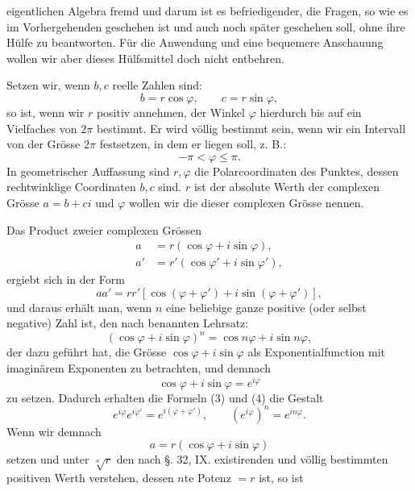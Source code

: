 
eigentlichen Algebra fremd und darum ist es befriedigender, die  Fragen, so wie es im Vorhergehenden geschehen ist und auch noch später geschehen soll, ohne ihre Hülfe zu beantworten. Für die Anwendung und eine bequemere Anschauung wollen wir aber dieses Hülfsmittel doch nicht entbehren.

Setzen wir, wenn $b,c$ reelle Zahlen sind:
\begin{equation}
 b=r\cos\varphi,\qquad c=r\sin\varphi,
\tag{1}
\end{equation}
so ist, wenn wir $r$ positiv annehmen, der Winkel $\varphi$ hierdurch bis auf ein Vielfaches von $2\pi$ bestimmt. Er wird völlig bestimmt sein, wenn wir ein Intervall von der Grösse $2\pi$ festsetzen, in dem er liegen soll, z. B.:
\[
 -\pi<\varphi\le \pi.
\]
In geometrischer Auffassung sind $r,\varphi$ die Polarcoordinaten des Punktes, dessen rechtwinklige Coordinaten $b,c$ sind. $r$ ist der absolute Werth der complexen Grösse $a=b+ci$ und $\varphi$ wollen wir die  dieser complexen Grösse nennen.

Das Product zweier complexen Grössen
\begin{equation}
\begin{aligned}
 a&=r(\cos\varphi+i\sin\varphi),\\
 a'&=r'(\cos\varphi'+i\sin\varphi'),
\end{aligned}
\tag{2}
\end{equation}
ergiebt sich in der Form
\begin{equation}
 aa'=rr'[\cos(\varphi+\varphi')+i\sin(\varphi+\varphi')],
\tag{3}
\end{equation}
und daraus erhält man, wenn $n$ eine beliebige ganze positive (oder selbst negative) Zahl ist, den nach  benannten Lehrsatz:
\begin{equation}
 (\cos\varphi+i\sin\varphi)^n=\cos n\varphi+i\sin n\varphi,
\tag{4}
\end{equation}
der dazu geführt hat, die Grösse $\cos\varphi+i\sin\varphi$ als Exponentialfunction mit imaginärem Exponenten zu betrachten, und demnach
\[
 \cos\varphi+i\sin\varphi=e^{i\varphi}
\]
zu setzen. Dadurch erhalten die Formeln (3) und (4) die Gestalt
\begin{equation}
 e^{i\varphi}e^{i\varphi'}=e^{i(\varphi+\varphi')},\qquad (e^{i\varphi})^n=e^{in\varphi}.
\tag{5}
\end{equation}
Wenn wir demnach
\begin{equation}
 a=r(\cos\varphi+i\sin\varphi)
\tag{6}
\end{equation}
setzen und unter $\sqrt[n]{r}$ den nach §. 32, IX. existirenden und völlig bestimmten positiven Werth verstehen, dessen $n$te Potenz $=r$ ist, so ist
